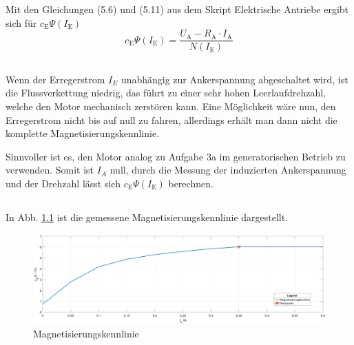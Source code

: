 \chapter{}\label{ex:aufg4}
%
\section{}\label{sec:aufg4a}
Mit den Gleichungen (5.6) und (5.11) aus dem Skript Elektrische Antriebe ergibt sich für $c_\text{E}\Psi(I_\text{E})$
\begin{equation}
c_\text{E}\Psi(I_\text{E}) = \frac{U_\text{A} - R_\text{A} \cdot I_\text{A}}{N(I_\text{E})}
\end{equation}
\section{}\label{sec:aufg4b}
Wenn der Erregerstrom $I_E$ unabhängig zur Ankerspannung abgeschaltet wird, ist die Flussverkettung niedrig, das führt zu einer sehr hohen Leerlaufdrehzahl, welche den Motor mechanisch zerstören kann. Eine Möglichkeit wäre nun, den Erregerstrom nicht bis auf null zu fahren, allerdings erhält man dann nicht die komplette Magnetisierungskennlinie.

Sinnvoller ist es, den Motor analog zu Aufgabe 3a im generatorischen Betrieb zu verwenden. Somit ist $I_A$ null, durch die Messung der induzierten Ankerspannung und der Drehzahl lässt sich $c_\text{E}\Psi(I_\text{E})$ berechnen.

\section{}\label{sec:aufg4c}
%
In Abb. \ref{fig:magnet} ist die gemessene Magnetisierungskennlinie dargestellt.
\begin{figure}[htb]

\includegraphics[width=1\textwidth]{./Bilder/magentisierungkennlinie_1}
\caption{Magnetisierungskennlinie}
\label{fig:magnet}
\end{figure}
%
